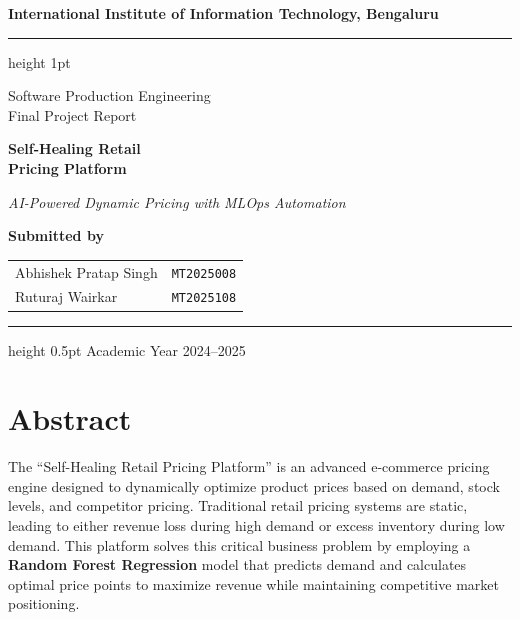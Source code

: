 \documentclass[12pt,a4paper]{report}
\begin{document}
\begin{titlepage}
    \centering
    \vspace*{1cm}

    {\Large\bfseries International Institute of Information Technology, Bengaluru\par}
    \vspace{0.5em}
    \hrule height 1pt
    \vspace{1.5cm}

    {\large Software Production Engineering\\[0.3em]Final Project Report\par}
    \vspace{2cm}

    {\Huge\bfseries\color{blue!60!black} Self-Healing Retail\\[0.3em]Pricing Platform\par}
    \vspace{1.5cm}
    {\normalsize\itshape AI-Powered Dynamic Pricing with MLOps Automation\par}
    \vspace{2.5cm}

    {\large\textbf{Submitted by}\par}
    \vspace{0.8em}
    \begin{tabular}{ll}
        Abhishek Pratap Singh & \texttt{MT2025008} \\[0.4em]
        Ruturaj Wairkar       & \texttt{MT2025108} \\
    \end{tabular}

    \vfill
    \hrule height 0.5pt
    \vspace{0.5em}
    {\small Academic Year 2024--2025}
\end{titlepage}

\tableofcontents
\clearpage

\chapter{Abstract}

The ``Self-Healing Retail Pricing Platform'' is an advanced e-commerce pricing engine designed to dynamically optimize product prices based on demand, stock levels, and competitor pricing. Traditional retail pricing systems are static, leading to either revenue loss during high demand or excess inventory during low demand. This platform solves this critical business problem by employing a \textbf{Random Forest Regression} model that predicts demand and calculates optimal price points to maximize revenue while maintaining competitive market positioning.
\end{document}
